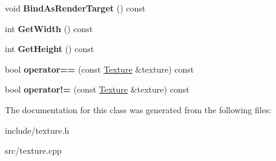 \begin{DoxyCompactItemize}
\item 
\hypertarget{class_z_e_g_l_1_1_texture_a4e8799fb199b39f37e6f2cd33891ecfd}{}void {\bfseries Bind\+As\+Render\+Target} () const \label{class_z_e_g_l_1_1_texture_a4e8799fb199b39f37e6f2cd33891ecfd}

\item 
\hypertarget{class_z_e_g_l_1_1_texture_a057016894ae04b4a4200810e9f4c731d}{}int {\bfseries Get\+Width} () const \label{class_z_e_g_l_1_1_texture_a057016894ae04b4a4200810e9f4c731d}

\item 
\hypertarget{class_z_e_g_l_1_1_texture_a0c457e03c54b4e9ccdcd05b9d4b05c11}{}int {\bfseries Get\+Height} () const \label{class_z_e_g_l_1_1_texture_a0c457e03c54b4e9ccdcd05b9d4b05c11}

\item 
\hypertarget{class_z_e_g_l_1_1_texture_ab6b921750abf88f35c1758eeb818f3bc}{}bool {\bfseries operator==} (const \hyperlink{class_z_e_g_l_1_1_texture}{Texture} \&texture) const \label{class_z_e_g_l_1_1_texture_ab6b921750abf88f35c1758eeb818f3bc}

\item 
\hypertarget{class_z_e_g_l_1_1_texture_a1fd02861e3eba8d3b4b0aec564ea8e6c}{}bool {\bfseries operator!=} (const \hyperlink{class_z_e_g_l_1_1_texture}{Texture} \&texture) const \label{class_z_e_g_l_1_1_texture_a1fd02861e3eba8d3b4b0aec564ea8e6c}

\end{DoxyCompactItemize}


The documentation for this class was generated from the following files\+:\begin{DoxyCompactItemize}
\item 
include/texture.\+h\item 
src/texture.\+cpp\end{DoxyCompactItemize}
